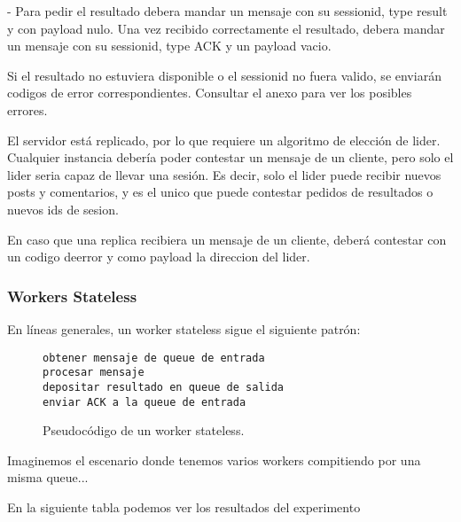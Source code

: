 \documentclass[titlepage,a4paper,oneside]{article}
\begin{document}
- Para pedir el resultado debera mandar un mensaje con su sessionid, type result y con payload nulo. Una vez recibido correctamente el resultado, debera mandar un mensaje con su sessionid, type ACK y un payload vacio.

Si el resultado no estuviera disponible o el sessionid no fuera valido, se enviarán codigos de error correspondientes. Consultar el anexo para ver los posibles errores.


El servidor está replicado, por lo que requiere un algoritmo de elección de lider. Cualquier instancia debería poder contestar un mensaje de un cliente, pero solo el lider seria capaz de llevar una sesión. Es decir, solo el lider puede recibir nuevos posts y comentarios, y es el unico que puede contestar pedidos de resultados o nuevos ids de sesion.

En caso que una replica recibiera un mensaje de un cliente, deberá contestar con un codigo deerror y como payload la direccion del lider.

\subsubsection{Workers Stateless}
En líneas generales, un worker stateless sigue el siguiente patrón:

\begin{figure}[H]
\begin{verbatim}
obtener mensaje de queue de entrada
procesar mensaje
depositar resultado en queue de salida
enviar ACK a la queue de entrada
\end{verbatim}
\caption{Pseudocódigo de un worker stateless.}
\end{figure}

Imaginemos el escenario donde tenemos varios workers compitiendo por una misma queue...%

En la siguiente tabla podemos ver los resultados del experimento %
\end{document}
